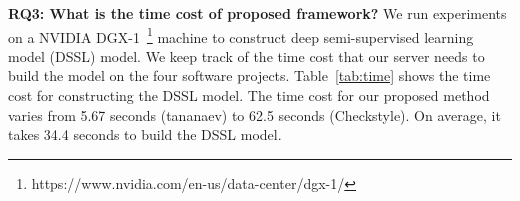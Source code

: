 \textbf{RQ3: What is the time cost of proposed framework?}
We run experiments on a NVIDIA DGX-1~\footnote{https://www.nvidia.com/en-us/data-center/dgx-1/} machine to construct deep semi-supervised learning model (DSSL) model. We keep track of the time cost that our server needs to build the model on the four software projects. Table~\ref{tab:time} shows the time cost for constructing the DSSL model. The time cost for our proposed method varies from 5.67 seconds (tananaev) to 62.5 seconds (Checkstyle). On average, it takes 34.4 seconds to build the DSSL model.  



